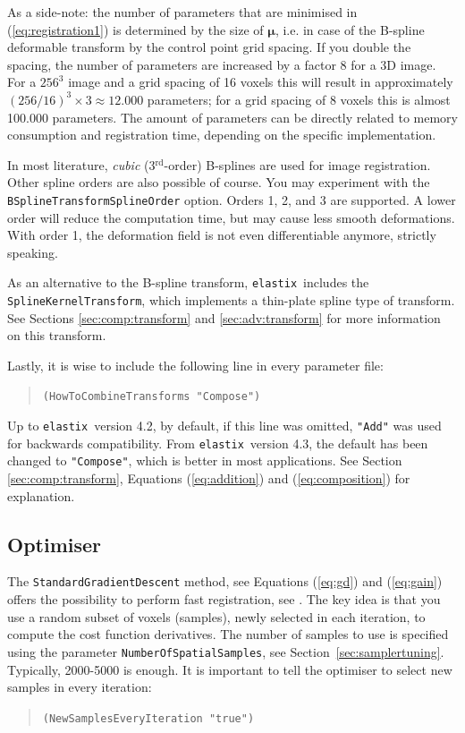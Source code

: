 \documentclass[]{report}
\newcommand{\elastix}{\texttt{elastix}}
\newcommand{\vmu}{\bm{\mu}}
\begin{document}
As a side-note: the number of parameters that are minimised in
(\ref{eq:registration1}) is determined by the size of $\vmu$, i.e.
in case of the B-spline deformable transform by the control point
grid spacing. If you double the spacing, the number of parameters
are increased by a factor 8 for a 3D image. For a $256^3$ image and
a grid spacing of 16 voxels this will result in approximately
$(256/16)^3 \times 3 \approx 12.000$ parameters; for a grid spacing
of 8 voxels this is almost 100.000 parameters. The amount of
parameters can be directly related to memory consumption and
registration time, depending on the specific implementation.

In most literature, \emph{cubic} (3$^\text{rd}$-order) B-splines are used for
image registration. Other spline orders are also possible of course. You may
experiment with the \texttt{BSplineTransformSplineOrder} option. Orders 1, 2,
and 3 are supported. A lower order will reduce the computation time, but may
cause less smooth deformations. With order 1, the deformation field is not even
differentiable anymore, strictly speaking.

As an alternative to the B-spline transform, \elastix\ includes the
\texttt{SplineKernelTransform}, which implements a thin-plate spline type of
transform. See Sections \ref{sec:comp:transform} and \ref{sec:adv:transform}
for more information on this transform.

Lastly, it is wise to include the following line in every
parameter file:
\begin{quote}
  \texttt{(HowToCombineTransforms "Compose")}
\end{quote}
Up to \elastix\ version 4.2, by default, if this line was omitted,
\texttt{"Add"} was used for backwards compatibility. From \elastix\ version
4.3, the default has been changed to \texttt{"Compose"}, which is better in
most applications. See Section \ref{sec:comp:transform}, Equations
(\ref{eq:addition}) and (\ref{eq:composition}) for explanation.

\subsection{Optimiser}\label{sec:optimizertuning}

The \texttt{StandardGradientDescent} method, see Equations
(\ref{eq:gd}) and (\ref{eq:gain}) offers the possibility to
perform fast registration, see \cite{KleinEA07}. The key idea is
that you use a random subset of voxels (samples), newly selected
in each iteration, to compute the cost function derivatives. The
number of samples to use is specified using the parameter
\texttt{NumberOfSpatialSamples}, see
Section~\ref{sec:samplertuning}. Typically, 2000-5000 is enough.
It is important to tell the optimiser to select new samples in
every iteration:
\begin{quote}
  \texttt{(NewSamplesEveryIteration "true")}
\end{quote}
\end{document}
